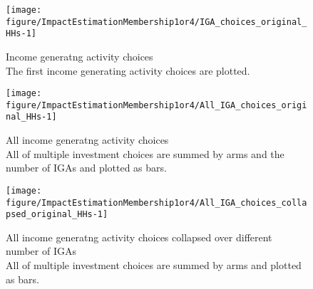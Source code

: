 \begin{Schunk}
\begin{figure}

{\centering \texttt{[image: figure/ImpactEstimationMembership1or4/IGA\_choices\_original\_HHs-1]} 

}

\caption{Income generatng activity choices\\ {\footnotesize The first income generating activity choices are plotted.\setlength{\baselineskip}{8pt}}}\label{Figure IGA choices original HHs}
\end{figure}
\end{Schunk}
\begin{Schunk}
\begin{figure}

{\centering \texttt{[image: figure/ImpactEstimationMembership1or4/All\_IGA\_choices\_original\_HHs-1]} 

}

\caption{All income generatng activity choices\\ {\footnotesize All of multiple investment choices are summed by arms and the number of IGAs and plotted as bars. \setlength{\baselineskip}{8pt}}}\label{Figure All IGA choices original HHs}
\end{figure}
\end{Schunk}
\begin{Schunk}
\begin{figure}

{\centering \texttt{[image: figure/ImpactEstimationMembership1or4/All\_IGA\_choices\_collapsed\_original\_HHs-1]} 

}

\caption{All income generatng activity choices collapsed over different number of IGAs\\ {\footnotesize All of multiple investment choices are summed by arms and plotted as bars. \setlength{\baselineskip}{8pt}}}\label{Figure All IGA choices collapsed original HHs}
\end{figure}
\end{Schunk}

